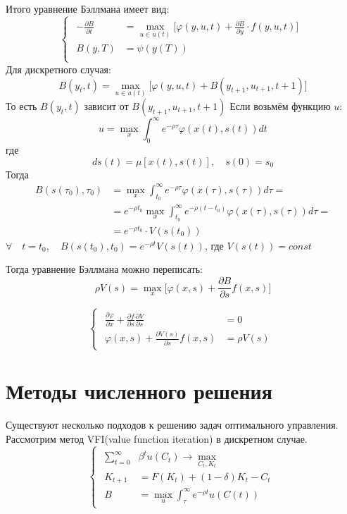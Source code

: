 \documentclass[a4paper,12pt]{article}
\begin{document}
{Итого уравнение Бэллмана имеет вид:
\begin{equation}
    \begin{cases}
    \begin{alignedat}{2}
    - \frac{\partial B}{\partial t} &= \max_{u \in u(t)}\biggl[ \varphi(y,u,t) + \frac{\partial B}{\partial y}\cdot f(y,u,t)  \biggr]  \\
    B(y,T) &= \psi(y(T)) \\
    \end{alignedat}
    \end{cases}
    \label{eq:bellman_equation}
\end{equation}
Для дискретного случая:
\[
    B(y_t,t) = \max_{u \in u(t)} \biggl[ \varphi(y,u,t) + B(y_{t+1},u_{t+1},t+1) \biggr]
\]
То есть $ B(y_t,t)$ зависит от $ B(y_{t+1},u_{t+1},t+1)$
Если возьмём функцию $u$:
\[
    u = \max_x  \int_{0}^{\infty} e^{-\rho \tau} \varphi(x(t),s(t)) dt
\]
где
\[
    d s(t) = \mu[x(t),s(t)] , \quad s(0) = s_{0}
\]
Тогда 
\begin{align}
    B(s(\tau_0),\tau_0) &= \max_x \int_{t_0}^{\infty} e^{-\rho\tau} \varphi(x(\tau),s(\tau)) d\tau = \\
    & = e^{-\rho t_0} \max_x \int_{t_0}^{\infty} e^{-\rho(t - t_0)} \varphi(x(\tau),s(\tau)) d\tau = \\
    & = e^{-\rho t_0} \cdot V(s(t_0))
\end{align}
$\forall \quad t = t_0 , \quad B(s(t_0),t_0) = e^{-\rho t} V(s(t))$, где  $V(s(t)) = const$

Тогда уравнение Бэллмана можно переписать:
\[  
    \rho V(s) = \max_x  \biggl[  \varphi(x,s) + \frac{\partial B}{\partial s} f(x,s)\biggr]
\]

\begin{equation}
    \begin{cases}
    \begin{alignedat}{2}
    \frac{\partial \varphi}{\partial x} + \frac{\partial f}{\partial s} \frac{\partial V}{\partial s}  &= 0  \\
    \varphi(x,s) + \frac{\partial V(s)}{\partial s} f(x,s) &=  \rho V(s) 
    \end{alignedat}
    \end{cases}
    \label{eq:bellman_equation_2}
\end{equation}
\section{Методы численного решения}
Существуют несколько подходов к решению задач оптимального управления. Рассмотрим метод VFI(value function iteration) в дискретном случае.  
\begin{equation}
    \begin{cases}
    \begin{alignedat}{2}
    \sum_{t=0}^\infty &\beta^t u(C_t)   \rightarrow \max_{C_t,K_t} \\
    K_{t+1} &= F(K_t) + (1-\delta)K_t - C_t \\
    B &= \max_u \int_{\tau}^{\infty } e^{-\rho t}u(C(t))
    \end{alignedat}
    \end{cases}
    \label{eq:vfi}
\end{equation}

}
\end{document}
